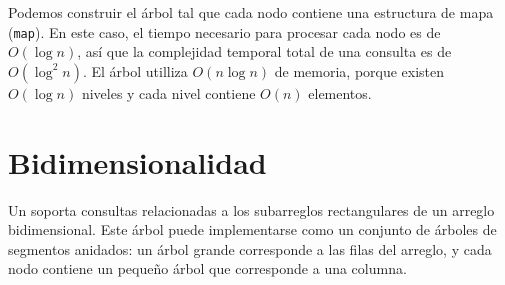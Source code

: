 \begin{center}
\end{center}

Podemos construir el árbol tal que cada nodo contiene una estructura de mapa
(\texttt{map}). En este caso, el tiempo necesario para procesar cada nodo es
de $O(\log n)$, así que la complejidad temporal total de una consulta es de
$O(\log^2 n)$. El árbol utilliza $O(n \log n)$ de memoria, porque existen
$O(\log n)$ niveles y cada nivel contiene $O(n)$ elementos.

\section{Bidimensionalidad}


Un  soporta consultas relacionadas
a los subarreglos rectangulares de un arreglo bidimensional. Este árbol
puede implementarse como un conjunto de árboles de segmentos anidados: un
árbol grande corresponde a las filas del arreglo, y cada nodo contiene un
pequeño árbol que corresponde a una columna.

